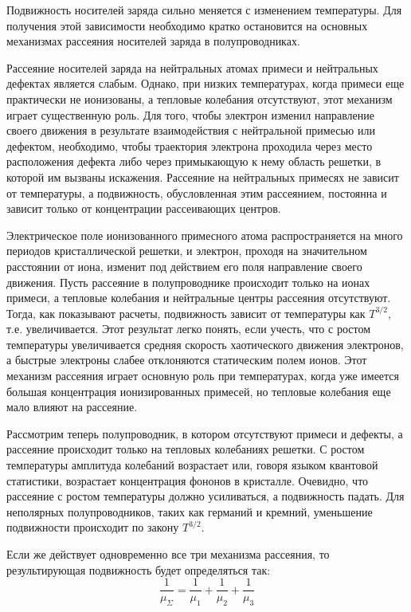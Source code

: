 Подвижность носителей заряда сильно меняется с изменением температуры. Для получения этой зависимости необходимо кратко
остановится на основных механизмах рассеяния носителей заряда в полупроводниках. 

Рассеяние носителей заряда на нейтральных атомах примеси и нейтральных дефектах является слабым. Однако, при низких
температурах, когда примеси еще практически не ионизованы, а тепловые колебания отсутствуют, этот механизм играет
существенную роль. Для того, чтобы электрон изменил направление своего движения в результате взаимодействия с
нейтральной примесью или дефектом, необходимо, чтобы траектория электрона проходила через место расположения дефекта
либо через примыкающую к нему область решетки, в которой им вызваны искажения. Рассеяние на нейтральных примесях не
зависит от температуры, а подвижность, обусловленная этим рассеянием, постоянна и зависит только от концентрации
рассеивающих центров.

Электрическое поле ионизованного примесного атома распространяется на много периодов кристаллической решетки, и
электрон, проходя на значительном расстоянии от иона, изменит под действием его поля направление своего движения. Пусть
рассеяние в полупроводнике происходит только на ионах примеси, а тепловые колебания и нейтральные центры рассеяния
отсутствуют. Тогда, как показывают расчеты, подвижность зависит от температуры как $T^{3/2}$, т.е. увеличивается. Этот
результат легко понять, если учесть, что с ростом температуры увеличивается средняя скорость хаотического движения
электронов, а быстрые электроны слабее отклоняются статическим полем ионов. Этот механизм рассеяния играет основную роль
при температурах, когда уже имеется большая концентрация ионизированных примесей, но тепловые колебания еще мало влияют
на рассеяние. 

Рассмотрим теперь полупроводник, в котором отсутствуют примеси и дефекты, а рассеяние происходит только на тепловых
колебаниях решетки. С ростом температуры амплитуда колебаний возрастает или, говоря языком квантовой статистики,
возрастает концентрация фононов в кристалле. Очевидно, что рассеяние с ростом температуры должно усиливаться, а
подвижность падать. Для неполярных полупроводников, таких как германий и кремний, уменьшение подвижности происходит по
закону $T^{3/2}$. 

Если же действует одновременно все три механизма рассеяния, то результирующая подвижность будет определяться так: 
\begin{equation}
	\frac{1}{\mu_{\Sigma}} = \frac{1}{\mu_{1}}+\frac{1}{\mu_{2}}+\frac{1}{\mu_{3}}
	\label{eq:3.1}
\end{equation}

